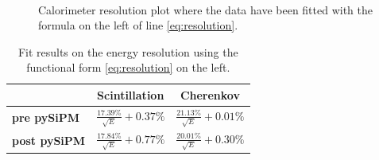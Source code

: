 \begin{figure}
	\centering
	 \\
	\caption{Calorimeter resolution plot where the data have been fitted with the formula on the left of line \ref{eq:resolution}.}
	\label{fig:sigma_su_e}
\end{figure}

\begin{table}
	\centering
	\begin{tabular}{lcc}
		\toprule
		& \textbf{Scintillation} & \textbf{Cherenkov} \\
		\midrule
		\textbf{pre pySiPM} &	$\frac{17.39\%}{\sqrt{E}}+0.37\%$ 	& $\frac{21.13\%}{\sqrt{E}}+0.01\%$ \\
		\textbf{post pySiPM} & $\frac{17.84\%}{\sqrt{E}}+0.77\%$ 	& $\frac{20.01\%}{\sqrt{E}}+0.30\%$ \\
		\bottomrule
	\end{tabular}
	\caption{Fit results on the energy resolution using the functional form \ref{eq:resolution} on the left.}
	\label{tab:res_regular_sum}
\end{table}

